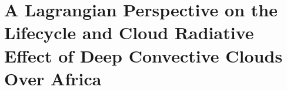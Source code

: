 \chapter{A Lagrangian Perspective on the Lifecycle and Cloud Radiative Effect of Deep Convective Clouds Over Africa}